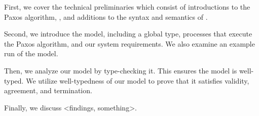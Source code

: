 First, we cover the technical preliminaries which consist of introductions to the Paxos algorithm, \FTMPST, and additions to the syntax and semantics of \FTMPST.

Second, we introduce the model, including a global type, processes that execute the Paxos algorithm, and our system requirements.
We also examine an example run of the model.

Then, we analyze our model by type-checking it.
This ensures the model is well-typed.
We utilize well-typedness of our model to prove that it satisfies validity, agreement, and termination.

Finally, we discuss <findings, something>.




